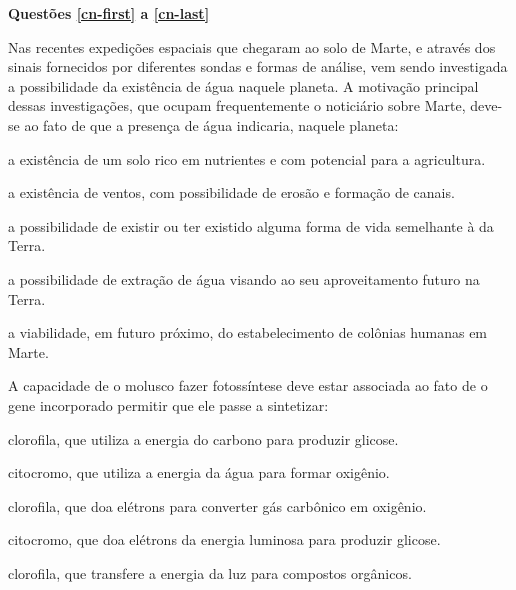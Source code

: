 
\noindent\textbf{Questões \ref{cn-first} a \ref{cn-last}} %

%
%

\questao \label{cn-first}
Nas recentes expedições espaciais que chegaram ao solo de Marte, e através dos sinais fornecidos por diferentes sondas e formas de análise, vem sendo investigada a possibilidade da existência de água naquele planeta. A motivação principal dessas investigações, que ocupam frequentemente o noticiário sobre Marte, deve-se ao fato de que a presença de água indicaria, naquele planeta:
\begin{alternativas}
\item a existência de um solo rico em nutrientes e com potencial para a agricultura. 
\item a existência de ventos, com possibilidade de erosão e formação de canais. 
\item a possibilidade de existir ou ter existido alguma forma de vida semelhante à da Terra. 
\item a possibilidade de extração de água visando ao seu aproveitamento futuro na Terra. 
\item a viabilidade, em futuro próximo, do estabelecimento de colônias humanas em Marte.
\end{alternativas}

\questao
{}
A capacidade de o molusco fazer fotossíntese deve estar associada ao fato de o gene incorporado permitir que ele passe a sintetizar:
\begin{alternativas}
\item clorofila, que utiliza a energia do carbono para produzir glicose. 
\item citocromo, que utiliza a energia da água para formar oxigênio. 
\item clorofila, que doa elétrons para converter gás carbônico em oxigênio. 
\item citocromo, que doa elétrons da energia luminosa para produzir glicose. 
\item clorofila, que transfere a energia da luz para compostos orgânicos.
\end{alternativas}

